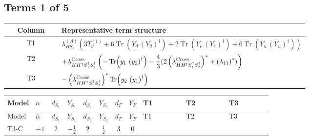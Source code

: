 \documentclass[8pt]{article}
\begin{document}
\begin{landscape}
\subsection*{Terms 1 of 5}
\begin{center}
\begin{tabular}{@{}c >{\raggedright\arraybackslash}p{0.82\linewidth}@{}}
\toprule
Column & Representative term structure \\
\midrule
T1 & \(\displaystyle {\lambda_{HS_1}^{(A)}} (3 T_{\nu}^{(1)}+6 \operatorname{Tr}\!\left({Y_d}\,\left({Y_d}\right)^{\dagger}\right)+2 \operatorname{Tr}\!\left({Y_e}\,\left({Y_e}\right)^{\dagger}\right)+6 \operatorname{Tr}\!\left({Y_u}\,\left({Y_u}\right)^{\dagger}\right))\) \\
\midrule
T2 & \(\displaystyle +{\lambda_{H H^\dagger S_1^\dagger S_2^\dagger}^{\rm Cross}} \left(-\operatorname{Tr}\!\left({y_1}\,\left({y_2}\right)^{\dagger}\right)-\frac{4}{3} (2 \left({\lambda_{H H^\dagger S_1^\dagger S_2^\dagger}^{\rm Cross}}\right)^{*}+\left({\lambda_{11}}\right)^{*})\right)\) \\
\midrule
T3 & \(\displaystyle -\left({\lambda_{H H^\dagger S_1^\dagger S_2^\dagger}^{\rm Cross}}\right)^{*} \operatorname{Tr}\!\left({y_2}\,\left({y_1}\right)^{\dagger}\right)\) \\
\midrule
\bottomrule
\end{tabular}
\end{center}
\smallskip
\tiny
\begin{longtable}{@{}llcccccc >{\raggedright\arraybackslash}p{0.21\linewidth} >{\raggedright\arraybackslash}p{0.21\linewidth} >{\raggedright\arraybackslash}p{0.21\linewidth}@{}}
\toprule
Model & $\alpha$ & $d_{S_1}$ & $Y_{S_1}$ & $d_{S_2}$ & $Y_{S_2}$ & $d_F$ & $Y_F$ & T1 & T2 & T3 \\
\midrule
\endfirsthead
\toprule
Model & $\alpha$ & $d_{S_1}$ & $Y_{S_1}$ & $d_{S_2}$ & $Y_{S_2}$ & $d_F$ & $Y_F$ & T1 & T2 & T3 \\
\midrule
\endhead
T3-C & $-1$ & $2$ & $-\frac{1}{2}$ & $2$ & $\frac{1}{2}$ & $3$ & $0$ & \scriptsize\adjustbox{max width=\linewidth}{$\begin{gathered} {\lambda_{HS_1}^{(A)}} (3 T_{\nu}^{(1)}+6 \operatorname{Tr}\!\left({Y_d}\,\left({Y_d}\right)^{\dagger}\right)+2 \operatorname{Tr}\!\left({Y_e}\,\left({Y_e}\right)^{\dagger}\right)+6 \operatorname{Tr}\!\left({Y_u}\,\left({Y_u}\right)^{\dagger}\right))\end{gathered}$} & \scriptsize\adjustbox{max width=\linewidth}{$\begin{gathered} +{\lambda_{H H^\dagger S_1^\dagger S_2^\dagger}^{\rm Cross}} \left(-\operatorname{Tr}\!\left({y_1}\,\left({y_2}\right)^{\dagger}\right)-\frac{4}{3} (2 \left({\lambda_{H H^\dagger S_1^\dagger S_2^\dagger}^{\rm Cross}}\right)^{*}+\left({\lambda_{11}}\right)^{*})\right)\end{gathered}$} & \scriptsize\adjustbox{max width=\linewidth}{$\begin{gathered} -\left({\lambda_{H H^\dagger S_1^\dagger S_2^\dagger}^{\rm Cross}}\right)^{*} \operatorname{Tr}\!\left({y_2}\,\left({y_1}\right)^{\dagger}\right)\end{gathered}$} \\

\end{longtable}
\end{landscape}
\end{document}
